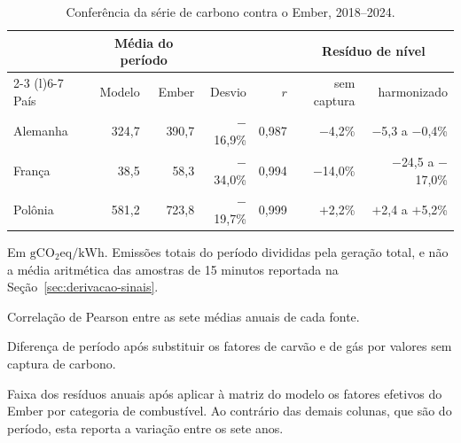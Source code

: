 \begin{table}[htb]
  \centering
  \begin{threeparttable}
    \caption{Conferência da série de carbono contra o Ember, 2018--2024.}
    \label{tab:conferencia-carbono}
    \small
    \begin{tabular}{@{}lrrrrrr@{}}
      \toprule
      & \multicolumn{2}{c}{Média do período\tnote{a}} & & & \multicolumn{2}{c}{Resíduo de nível} \\
      \cmidrule(lr){2-3} \cmidrule(l){6-7}
      País & Modelo & Ember & Desvio & $r$\tnote{b} & sem captura\tnote{c} & harmonizado\tnote{d} \\
      \midrule
      Alemanha & 324,7 & 390,7 & $-$16,9\% & 0,987 & $-$4,2\%  & $-$5,3 a $-$0,4\%  \\
      França   &  38,5 &  58,3 & $-$34,0\% & 0,994 & $-$14,0\% & $-$24,5 a $-$17,0\% \\
      Polônia  & 581,2 & 723,8 & $-$19,7\% & 0,999 & $+$2,2\%  & $+$2,4 a $+$5,2\%   \\
      \bottomrule
    \end{tabular}
    \begin{tablenotes}\footnotesize
      \item[a] Em $\mathrm{gCO_{2}eq/kWh}$. Emissões totais do período divididas pela geração
        total, e não a média aritmética das amostras de 15 minutos reportada na
        Seção~\ref{sec:derivacao-sinais}.
      \item[b] Correlação de Pearson entre as sete médias anuais de cada fonte.
      \item[c] Diferença de período após substituir os fatores de carvão e de gás por valores
        sem captura de carbono.
      \item[d] Faixa dos resíduos anuais após aplicar à matriz do modelo os fatores efetivos do
        Ember por categoria de combustível. Ao contrário das demais colunas, que são do período,
        esta reporta a variação entre os sete anos.
    \end{tablenotes}
  \end{threeparttable}
\end{table}

